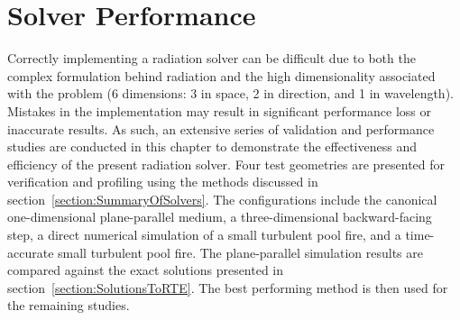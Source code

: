 \addchapheadtotoc
\chapter{Solver Performance}\label{chapter:Example}
Correctly implementing a radiation solver can be difficult due to both the complex formulation behind radiation and the high dimensionality associated with the problem (6 dimensions: 3 in space, 2 in direction, and 1 in wavelength). Mistakes in the implementation may result in significant performance loss or inaccurate results. As such, an extensive series of validation and performance studies are conducted in this chapter to demonstrate the effectiveness and efficiency of the present radiation solver. 
Four test geometries are presented for verification and profiling using the methods discussed in section~\ref{section:SummaryOfSolvers}. 
The configurations include the canonical one-dimensional plane-parallel medium, a three-dimensional backward-facing step, a direct numerical simulation of a small turbulent pool fire, and a time-accurate small turbulent pool fire. 
The plane-parallel simulation results are compared against the exact solutions presented in section~\ref{section:SolutionsToRTE}. The best performing method is then used for the remaining studies.



